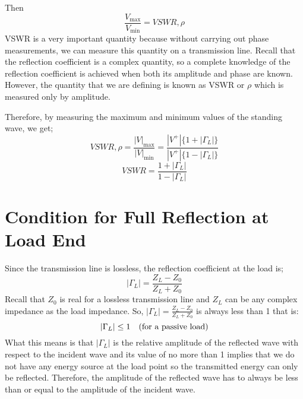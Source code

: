 Then 
\[\dfrac{V_{\max}}{V_{\min}}= VSWR, \rho\] 
VSWR is a very important quantity because without carrying out phase measurements, we can measure this quantity on a transmission line. Recall that the reflection coefficient is a complex quantity, so a complete knowledge of the reflection coefficient is achieved when both its amplitude and phase are known. However, the quantity that we are defining is known as VSWR or \(\rho\) which is measured only by amplitude.

Therefore, by measuring the maximum and minimum values of the standing wave, we get;
\begin{dmath*}
VSWR, \rho =\frac{|V|_{\max}}{|V|_{\min}} = \frac{|V^+|\{1+|\Gamma_L|\}}{|V^+|\{1-|\Gamma_L|\}}
\end{dmath*}
\begin{equation}
VSWR = \frac{1+|\Gamma_L|}{1-|\Gamma_L|}
\label{eqn:vswr}	
\end{equation}

\section{Condition for Full Reflection at Load End}
Since the transmission line is lossless, the reflection coefficient at the load is;
\begin{equation*}
|\Gamma_L| = \frac{Z_L-Z_0}{Z_L+Z_0}
\end{equation*}
Recall that $Z_0$ is real for a lossless transmission line and $Z_L$ can be any complex impedance as the load impedance. So, $|\Gamma_L| = \frac{Z_L-Z_0}{Z_L+Z_0}$ is always less than 1 that is:
\begin{equation*}
|\Gamma_L|\leq 1\quad (\textnormal{for a passive load})
\end{equation*}
What this means is that $|\Gamma_L|$ is the relative amplitude of the reflected wave with respect to the incident wave and its value of no more than 1 implies that we do not have any energy source at the load point so the transmitted energy can only be reflected. Therefore, the amplitude of the reflected wave has to always be less than or equal to the amplitude of the incident wave.

